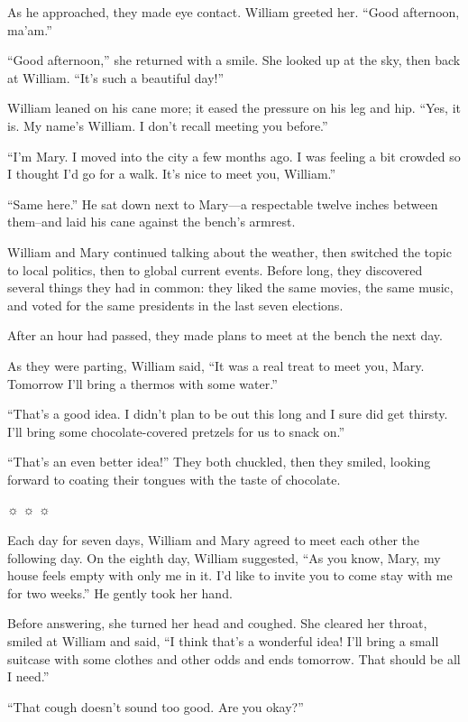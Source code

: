 As he approached, they made eye contact. William greeted her. “Good afternoon, ma'am.”

“Good afternoon,” she returned with a smile. She looked up at the sky, then back at William. “It's such a beautiful day!”

William leaned on his cane more; it eased the pressure on his leg and hip. “Yes, it is. My name's William. I don't recall meeting you before.”

“I'm Mary. I moved into the city a few months ago. I was feeling a bit crowded so I thought I'd go for a walk. It's nice to meet you, William.”

“Same here.” He sat down next to Mary—a respectable twelve inches between them–and laid his cane against the bench's armrest.

William and Mary continued talking about the weather, then switched the topic to local politics, then to global current events. Before long, they discovered several things they had in common: they liked the same movies, the same music, and voted for the same presidents in the last seven elections.

After an hour had passed, they made plans to meet at the bench the next day.

As they were parting, William said, “It was a real treat to meet you, Mary. Tomorrow I'll bring a thermos with some water.”

“That's a good idea. I didn't plan to be out this long and I sure did get thirsty. I'll bring some chocolate-covered pretzels for us to snack on.”

“That's an even better idea!” They both chuckled, then they smiled, looking forward to coating their tongues with the taste of chocolate.



☼ ☼ ☼





Each day for seven days, William and Mary agreed to meet each other the following day. On the eighth day, William suggested, “As you know, Mary, my house feels empty with only me in it. I'd like to invite you to come stay with me for two weeks.” He gently took her hand.

Before answering, she turned her head and coughed. She cleared her throat, smiled at William and said, “I think that's a wonderful idea! I'll bring a small suitcase with some clothes and other odds and ends tomorrow. That should be all I need.”

“That cough doesn't sound too good. Are you okay?”

